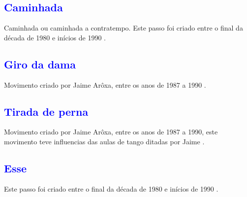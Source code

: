 
\subsection{\textcolor{blue}{Caminhada}} 
 Caminhada ou caminhada a contratempo.
Este passo foi  criado entre o final da década de 1980 e inícios de 1990  \cite[pp. 143]{perna2002samba}.

\subsection{\textcolor{blue}{Giro da dama}}
Movimento criado por Jaime Arôxa, entre os anos de 1987 a 1990 \cite{EntrevistaJaimeAroxa1} \cite[pp. 144]{perna2002samba}.


\subsection{\textcolor{blue}{Tirada de perna}}
Movimento criado por Jaime Arôxa, entre os anos de 1987 a 1990,
este movimento teve influencias das aulas de tango ditadas por Jaime \cite{EntrevistaJaimeAroxa1} \cite[pp. 144]{perna2002samba}.

\subsection{\textcolor{blue}{Esse}}
Este passo foi  criado entre o final da década de 1980 e inícios de 1990  \cite[pp. 143]{perna2002samba}.

